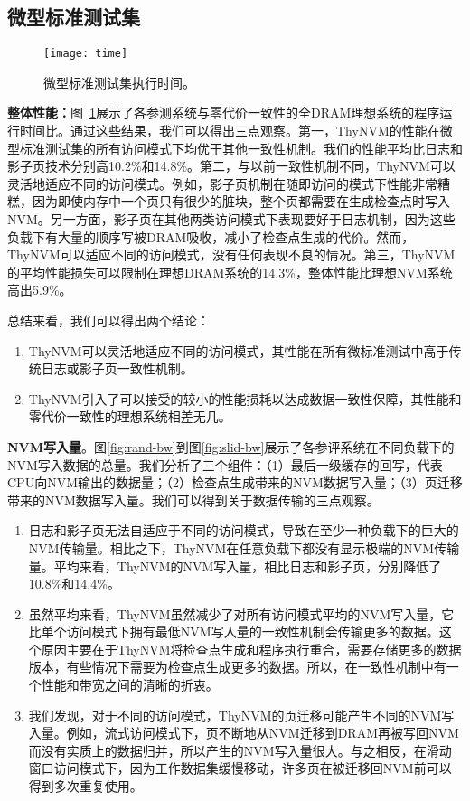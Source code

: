 \subsection{微型标准测试集}

\begin{figure}[!h]
  \centering
  \texttt{[image: time]}
  \caption{微型标准测试集执行时间。}
  \label{fig:micro-time}
\end{figure}

\textbf{整体性能：}图~\ref{fig:micro-time}展示了各参测系统与零代价一致性的全DRAM理想系统的程序运行时间比。通过这些结果，我们可以得出三点观察。第一，ThyNVM的性能在微型标准测试集的所有访问模式下均优于其他一致性机制。我们的性能平均比日志和影子页技术分别高10.2\%和14.8\%。第二，与以前一致性机制不同，ThyNVM可以灵活地适应不同的访问模式。例如，影子页机制在随即访问的模式下性能非常糟糕，因为即使内存中一个页只有很少的脏块，整个页都需要在生成检查点时写入NVM。另一方面，影子页在其他两类访问模式下表现要好于日志机制，因为这些负载下有大量的顺序写被DRAM吸收，减小了检查点生成的代价。然而，ThyNVM可以适应不同的访问模式，没有任何表现不良的情况。第三，ThyNVM的平均性能损失可以限制在理想DRAM系统的14.3\%，整体性能比理想NVM系统高出5.9\%。

总结来看，我们可以得出两个结论：
\begin{enumerate}
\item ThyNVM可以灵活地适应不同的访问模式，其性能在所有微标准测试中高于传统日志或影子页一致性机制。 
\item ThyNVM引入了可以接受的较小的性能损耗以达成数据一致性保障，其性能和零代价一致性的理想系统相差无几。
\end{enumerate}

\textbf{NVM写入量}。图\ref{fig:rand-bw}到图\ref{fig:slid-bw}展示了各参评系统在不同负载下的NVM写入数据的总量。我们分析了三个组件：（1）最后一级缓存的回写，代表CPU向NVM输出的数据量；（2）检查点生成带来的NVM数据写入量；（3）页迁移带来的NVM数据写入量。我们可以得到关于数据传输的三点观察。
\begin{enumerate}
\item 日志和影子页无法自适应于不同的访问模式，导致在至少一种负载下的巨大的NVM传输量。相比之下，ThyNVM在任意负载下都没有显示极端的NVM传输量。平均来看，ThyNVM的NVM写入量，相比日志和影子页，分别降低了10.8\%和14.4\%。
\item 虽然平均来看，ThyNVM虽然减少了对所有访问模式平均的NVM写入量，它比单个访问模式下拥有最低NVM写入量的一致性机制会传输更多的数据。这个原因主要在于ThyNVM将检查点生成和程序执行重合，需要存储更多的数据版本，有些情况下需要为检查点生成更多的数据。所以，在一致性机制中有一个性能和带宽之间的清晰的折衷。
\item 我们发现，对于不同的访问模式，ThyNVM的页迁移可能产生不同的NVM写入量。例如，流式访问模式下，页不断地从NVM迁移到DRAM再被写回NVM而没有实质上的数据归并，所以产生的NVM写入量很大。与之相反，在滑动窗口访问模式下，因为工作数据集缓慢移动，许多页在被迁移回NVM前可以得到多次重复使用。 
\end{enumerate}

